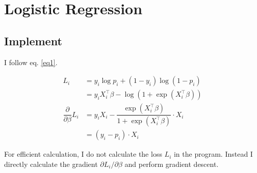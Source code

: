 \documentclass{article}
\begin{document}
\section{Logistic Regression}
\subsection{Implement}
I follow eq. \ref{eq1}.
\begin{spacing}{1.5}
\begin{equation}
    \begin{array}{ll}
        L_i &= y_i\log p_i + (1-y_i)\log (1-p_i)\\
            &= y_iX_i^\top \beta - \log(1+\exp(X_i^\top \beta))\\
        \dfrac{\partial}{\partial\beta}L_i &= 
        y_iX_i - \dfrac{\exp(X_i^\top\beta)}{1+\exp(X_i^\top\beta)}\cdot X_i\\
            &= (y_i - p_i)\cdot X_i
    \end{array}
    \label{eq1}
\end{equation}
\end{spacing}
For efficient calculation, I do not calculate the loss $L_i$ in the program. Instead I directly calculate the gradient $\partial L_i/\partial\beta$ and perform gradient descent.  
\end{document}
